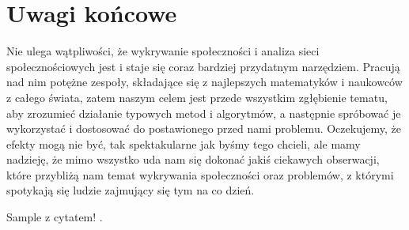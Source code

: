 \documentclass{article}
\begin{document}
\newpage
\section{Uwagi końcowe}


Nie ulega wątpliwości, że wykrywanie społeczności i analiza sieci społecznościowych jest i staje się coraz bardziej przydatnym narzędziem. Pracują nad nim potężne zespoły, składające się z najlepszych matematyków i naukowców z całego świata, zatem naszym celem jest przede wszystkim zgłębienie tematu, aby zrozumieć działanie typowych metod i algorytmów, a następnie spróbować je wykorzystać i dostosować do postawionego przed nami problemu. Oczekujemy, że efekty mogą nie być, tak spektakularne jak byśmy tego chcieli, ale mamy nadzieję, że mimo wszystko uda nam się dokonać jakiś ciekawych obserwacji, które przybliżą nam temat wykrywania społeczności oraz problemów, z którymi spotykają się ludzie zajmujący się tym na co dzień. 


Sample z cytatem!
\cite{sample}.

\printbibliography
\end{document}
